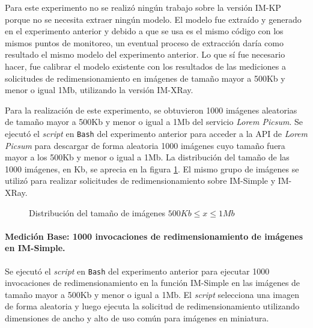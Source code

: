 Para este experimento no se realizó ningún trabajo sobre la versión IM-KP porque no se necesita extraer ningún modelo. El modelo fue extraído y generado en el experimento anterior y debido a que se usa es el mismo código con los mismos puntos de monitoreo, un eventual proceso de extracción daría como resultado el mismo modelo del experimento anterior. Lo que sí fue necesario hacer, fue calibrar el modelo existente con los resultados de las mediciones a solicitudes de redimensionamiento en imágenes de tamaño mayor a 500Kb y menor o igual 1Mb, utilizando la versión IM-XRay.

Para la realización de este experimento, se obtuvieron 1000 imágenes aleatorias de tamaño mayor a 500Kb y menor o igual a 1Mb del servicio \emph{Lorem Picsum}. Se ejecutó el \emph{script} en \texttt{Bash} del experimento anterior para acceder a la API de \emph{Lorem Picsum} para descargar de forma aleatoria 1000 imágenes cuyo tamaño fuera mayor a los 500Kb y menor o igual a 1Mb. La distribución del tamaño de las 1000 imágenes, en Kb, se aprecia en la figura \ref{fig:distribucion-tamanno-imagenes-hasta-1mb}. El mismo grupo de imágenes se utilizó para realizar solicitudes de redimensionamiento sobre IM-Simple y IM-XRay.

\begin{figure}
\hspace{-1.0cm}
\caption{Distribución del tamaño de imágenes $500Kb \leq x \leq 1Mb$}
\label{fig:distribucion-tamanno-imagenes-hasta-1mb}
\end{figure}

\paragraph{Medición Base: 1000 invocaciones de redimensionamiento de imágenes en IM-Simple.} 
Se ejecutó el \emph{script} en \texttt{Bash} del experimento anterior para ejecutar 1000 invocaciones de redimensionamiento en la función IM-Simple en las imágenes de tamaño mayor a 500Kb y menor o igual a 1Mb. El \emph{script} selecciona una imagen de forma aleatoria y luego ejecuta la solicitud de redimensionamiento utilizando dimensiones de ancho y alto de uso común para imágenes en miniatura.

